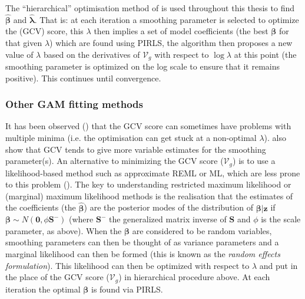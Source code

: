 The ``hierarchical'' optimisation method of  is used throughout this thesis to find $\bm{\hat{\beta}}$ and $\bm{\hat{\lambda}}$. That is: at each iteration a smoothing parameter is selected to optimize the (GCV) score, this $\lambda$ then implies a set of model coefficients (the best $\bm{\beta}$ for that given $\lambda$) which are found using PIRLS, the algorithm then proposes a new value of $\lambda$ based on the derivatives of $\mathcal{V}_g$ with respect to $\log \lambda$ at this point (the smoothing parameter is optimized on the log scale to ensure that it remains positive). This continues until convergence.

\subsubsection{Other GAM fitting methods}
\label{intro-otherGAMfit}

It has been observed (\cite{reissogden}) that the GCV score can sometimes have problems with multiple minima (i.e. the optimisation can get stuck at a non-optimal $\lambda$). \cite{reissogden} also show that GCV tends to give more variable estimates for the smoothing parameter(s). An alternative to minimizing the GCV score ($\mathcal{V}_g$) is to use a likelihood-based method such as approximate REML or ML, which are less prone to this problem (\cite{remlpaper}). The key to understanding restricted maximum likelihood or (marginal) maximum likelihood methods is the realisation that the estimates of the coefficients (the $\bm{\hat{\beta}}$) are the posterior modes of the distribution of $\bm{\beta}|\mathbf{z}$ if $\bm{\beta} \sim N(\mathbf{0}, \phi \mathbf{S}^-)$ (where $\mathbf{S}^-$ the generalized matrix inverse of $\mathbf{S}$ and $\phi$ is the scale parameter, as above). When the $\bm{\beta}$ are considered to be random variables, smoothing parameters can then be thought of as variance parameters and a marginal likelihood can then be formed (this is known as the \textit{random effects formulation}).  This likelihood can then be optimized with respect to $\lambda$ and put in the place of the GCV score ($\mathcal{V}_g$) in hierarchical procedure above. At each iteration the optimal $\bm{\beta}$ is found via PIRLS.

